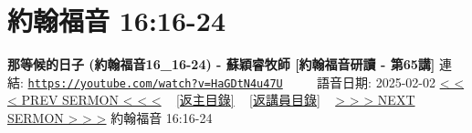 \documentclass{book}
\begin{document}
\section{約翰福音 16:16-24}
\label{sec:HaGDtN4u47U}
\textbf{那等候的日子 (約翰福音16\_16-24) - 蘇穎睿牧師 [約翰福音研讀 - 第65講]}
\newline
\newline
連結: \href{https://youtube.com/watch?v=HaGDtN4u47U}{\texttt{https://youtube.com/watch?v=HaGDtN4u47U}} ~~~~ 語音日期: 2025-02-02
\newline
\newline
\hyperref[sec:M4alGuubf1o]{< < < PREV SERMON < < <}
~
\hyperlink{toc}{[返主目錄]}
~
\hyperref[ch:preacher11]{[返講員目錄]}
~
\hyperref[sec:fV_h6TniAkc]{> > > NEXT SERMON > > >}
\newline
\newline
約翰福音 16:16-24
\newline
\end{document}
